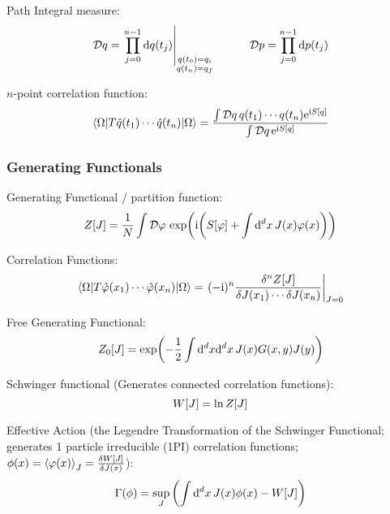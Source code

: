 		\noindent
		Path Integral measure:
		\begin{equation}
			\mathcal{D}q = \eval{\prod_{j=0}^{n-1} \dd q(t_j)}_{\substack{q(t_0)=q_i\\q(t_n)=q_f}}
			\hsp
			\mathcal{D}p = \prod_{j=0}^{n-1} \dd p(t_j)
		\end{equation}
		
		\noindent
		$n$-point correlation function:
		\begin{equation}
			\mel**{\Omega}{T\hat{q}(t_1)\dotsb\hat{q}(t_n)}{\Omega} = \frac{\int\mathcal{D}q\,q(t_1)\dotsb q(t_n)\mathrm{e}^{\mathrm{i} S \qty[q]}}{\int\mathcal{D}q\,\mathrm{e}^{\mathrm{i} S\qty[q]}}
		\end{equation}

		\subsubsection{Generating Functionals}
			Generating Functional / partition function:
			\begin{equation}
				Z[J] = \frac{1}{N} \int \mathcal{D}\varphi\, \exp(\mathrm{i}\qty(S[\varphi] + \int \dd^d x \, J(x) \varphi(x)))
			\end{equation}
			
			\noindent
			Correlation Functions:
			\begin{equation}
				\mel**{\Omega}{T \hat{\varphi}(x_1) \dotsb \hat{\varphi}(x_n)}{\Omega} = \eval{(-\i)^{n} \frac{\delta^n Z[J]}{\delta J(x_1) \dotsb \delta J(x_n)}}_{J=0}
			\end{equation}

			\noindent
			Free Generating Functional:
			\begin{equation}
				Z_0\qty[J] = \exp(-\frac{1}{2}\int\dd^d x \dd^d x\, J(x) G(x,y)J(y))
			\end{equation}

			\noindent
			Schwinger functional (Generates connected correlation functions):
			\begin{equation}
				W\qty[J] = \ln Z\qty[J]
			\end{equation}

			\noindent
			Effective Action (\ie the Legendre Transformation of the Schwinger Functional; generates 1 particle irreducible (1PI) correlation functions; $\phi(x) = \Avg{\varphi(x)}_J = \fdv{W\qty[J]}{J(x)}$):
			\begin{equation}
				\Gamma(\phi) = \sup_{J} \qty( \int \dd^d x \, J(x) \phi(x) - W[J])
			\end{equation}
			
